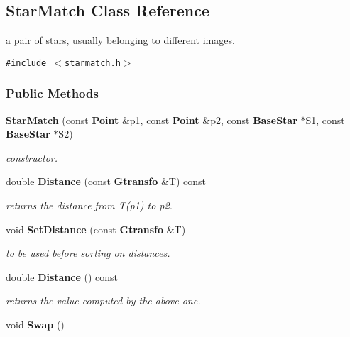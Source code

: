 \subsection{Star\-Match  Class Reference}
\label{class_starmatch}
a pair of stars, usually belonging to different images. 


{\tt \#include $<$starmatch.h$>$}

\subsubsection*{Public Methods}
\begin{CompactItemize}
\item 
{\bf Star\-Match} (const {\bf Point} \&p1, const {\bf Point} \&p2, const {\bf Base\-Star} $\ast$S1, const {\bf Base\-Star} $\ast$S2)
\begin{CompactList}\small\item\em constructor.\item\end{CompactList}\item 
{}
double {\bf Distance} (const {\bf Gtransfo} \&T) const\label{class_starmatch_a1}

\begin{CompactList}\small\item\em returns the distance from T(p1) to p2.\item\end{CompactList}\item 
{}
void {\bf Set\-Distance} (const {\bf Gtransfo} \&T)\label{class_starmatch_a2}

\begin{CompactList}\small\item\em to be used before sorting on distances.\item\end{CompactList}\item 
{}
double {\bf Distance} () const\label{class_starmatch_a3}

\begin{CompactList}\small\item\em returns the value computed by the above one.\item\end{CompactList}\item 
{}
void {\bf Swap} ()\label{class_starmatch_a4}


\end{CompactItemize}
